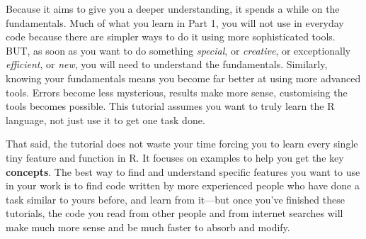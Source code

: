 \documentclass[
]{article}
\begin{document}
Because it aims to give you a deeper understanding, it spends a while on
the fundamentals. Much of what you learn in Part 1, you will not use in
everyday code because there are simpler ways to do it using more
sophisticated tools. BUT, as soon as you want to do something
\emph{special}, or \emph{creative}, or exceptionally \emph{efficient},
or \emph{new}, you will need to understand the fundamentals. Similarly,
knowing your fundamentals means you become far better at using more
advanced tools. Errors become less mysterious, results make more sense,
customising the tools becomes possible. This tutorial assumes you want
to truly learn the R language, not just use it to get one task done.

That said, the tutorial does not waste your time forcing you to learn
every single tiny feature and function in R. It focuses on examples to
help you get the key \textbf{concepts}. The best way to find and
understand specific features you want to use in your work is to find
code written by more experienced people who have done a task similar to
yours before, and learn from it---but once you've finished these
tutorials, the code you read from other people and from internet
searches will make much more sense and be much faster to absorb and
modify.
\end{document}
